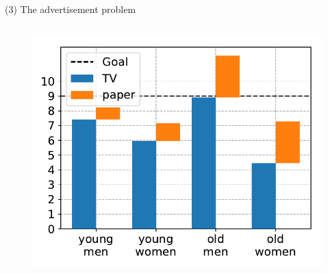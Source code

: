 \documentclass[11pt, aspectratio=149]{beamer}
\theoremstyle{plain}
\begin{document}
\begin{frame}[fragile, t]{(3) The advertisement problem}
\begin{columns}
\begin{column}{0.5\textwidth}
\begin{figure}
				\includegraphics[width=0.8\linewidth]{figs/advertisement_statement_sol.pdf}
			\end{figure}
		\end{column}
	\end{columns}
\end{frame}


\end{document}
